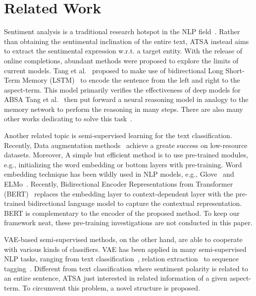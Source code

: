 \documentclass[11pt,a4paper]{article}
\begin{document}
\section{Related Work}
Sentiment analysis is a traditional research hotspot in the NLP field~\cite{wang2012baselines}.
Rather than obtaining the sentimental inclination of the entire text, ATSA instead aims to extract the sentimental expression w.r.t. a target entity.
With the release of online completions, abundant methods were proposed to explore the limits of current models.
Tang et al.~\cite{DBLP:conf/coling/TangQFL16} proposed to make use of bidirectional Long Short-Term Memory (LSTM)~\cite{DBLP:journals/neco/HochreiterS97} to encode the sentence from the left and right to the aspect-term.
This model primarily verifies the effectiveness of deep models for ABSA
Tang et al.~\cite{DBLP:conf/emnlp/TangQL16} then put forward a neural reasoning model in analogy to the memory network to perform the reasoning in many steps.
There are also many other works dedicating to solve this task~\cite{DBLP:conf/acl/PanW18,DBLP:conf/naacl/LiuCB18,DBLP:conf/eacl/ZhangL17}.

Another related topic is semi-supervised learning for the text classification. Recently, Data augmentation methods~\cite{xie2019unsupervised,berthelot2019mixmatch} achieve a greate success on low-resource datasets. Moreover,
A simple but efficient method is to use pre-trained modules, e.g., initializing the word embedding or bottom layers with pre-training. Word embedding technique has been wildly used in NLP models, e.g., Glove~\cite{DBLP:conf/emnlp/PenningtonSM14} and ELMo~\cite{DBLP:conf/naacl/PetersNIGCLZ18}. Recently, Bidirectional Encoder Representations from Transformer (BERT)~\cite{devlin2018bert} replaces the embedding layer to context-dependent layer with the pre-trained bidirectional language model to capture the contextual representation. BERT is complementary to the encoder of the proposed method. To keep our framework neat, these pre-training investigations are not conducted in this paper.



VAE-based semi-supervised methods, on the other hand, are able to cooperate with various kinds of classifiers.
VAE has been applied in many semi-supervised NLP tasks, ranging from text classification~\cite{xu2017variational}, relation extraction~\cite{DBLP:journals/tacl/MarcheggianiT16} to sequence tagging~\cite{chen2018variational}. Different from text classification where sentiment polarity is related to an entire sentence, ATSA just interested in related information of a given aspect-term. To circumvent this problem, a novel structure is proposed.
\end{document}
